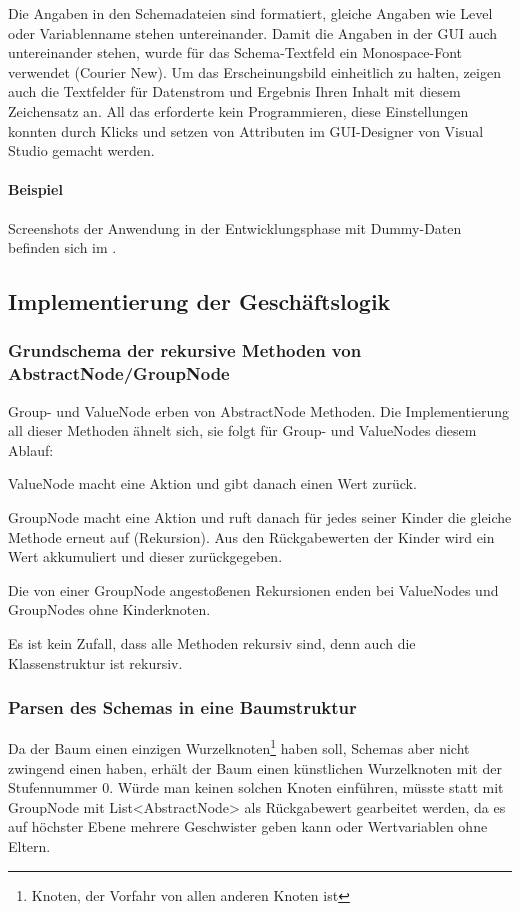 Die Angaben in den Schemadateien sind formatiert, gleiche Angaben wie Level oder Variablenname stehen untereinander. Damit die Angaben in der GUI auch untereinander stehen, wurde für das Schema-Textfeld ein Monospace-Font verwendet (Courier New). Um das Erscheinungsbild einheitlich zu halten, zeigen auch die Textfelder für Datenstrom und Ergebnis Ihren Inhalt mit diesem Zeichensatz an.
All das erforderte kein Programmieren, diese Einstellungen konnten durch Klicks und setzen von Attributen im GUI-Designer von Visual Studio gemacht werden.
\paragraph{Beispiel}
Screenshots der Anwendung in der Entwicklungsphase mit Dummy-Daten befinden sich im .


\subsection{Implementierung der Geschäftslogik}
\label{sec:ImplementierungGeschaeftslogik}

\subsubsection{Grundschema der rekursive Methoden von AbstractNode/GroupNode}
Group- und ValueNode erben von AbstractNode Methoden. Die Implementierung all dieser Methoden ähnelt sich, sie folgt für Group- und ValueNodes diesem Ablauf:

ValueNode macht eine Aktion und gibt danach einen Wert zurück.

GroupNode macht eine Aktion und ruft danach für jedes seiner Kinder die gleiche Methode erneut auf (Rekursion). Aus den Rückgabewerten der Kinder wird ein Wert akkumuliert und dieser zurückgegeben.

Die von einer GroupNode angestoßenen Rekursionen enden bei ValueNodes und GroupNodes ohne Kinderknoten.

Es ist kein Zufall, dass alle Methoden rekursiv sind, denn auch die Klassenstruktur ist rekursiv.



\subsubsection{Parsen des Schemas in eine Baumstruktur}
Da der Baum einen einzigen Wurzelknoten\footnote{Knoten, der Vorfahr von allen anderen Knoten ist} haben soll, Schemas aber nicht zwingend einen haben, erhält der Baum einen künstlichen Wurzelknoten mit der Stufennummer 0. Würde man keinen solchen Knoten einführen, müsste statt mit GroupNode mit List<AbstractNode> als Rückgabewert gearbeitet werden, da es auf höchster Ebene mehrere Geschwister geben kann oder Wertvariablen ohne Eltern.

